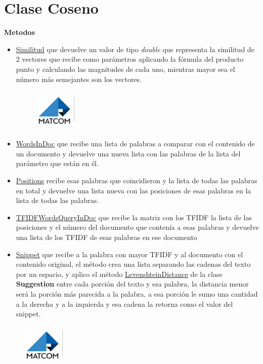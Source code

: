 \documentclass[a4paper,12pt]{article}
\begin{document}
\section{Clase Coseno}
\large\textbf{Metodos}
\begin{itemize}
    \item \underline{Similitud} que devuelve un valor de tipo \textit{double} que representa la similitud
    de 2 vectores que recibe como parámetros aplicando la fórmula del
    producto punto y calculando las magnitudes de cada uno, mientras
    mayor sea el número más semejantes son los vectores.
    \begin{figure}[t]
        \hspace{13cm}
    \includegraphics[width=2cm,height=2cm]{Logo de Matcom.png}
    \end{figure}
    \item \underline{WordsInDoc} que recibe una lista de palabras a comparar con el
    contenido de un documento y devuelve una nueva lista con las palabras
    de la lista del parámetro que están en él.
    \item \underline{Positions} recibe esas palabras que coincidieron y la lista de todas las
    palabras en total y devuelve una lista nueva con las posiciones de esas
    palabras en la lista de todas las palabras.
    \item \underline{TFIDFWordsQueryInDoc} que recibe la matriz con los TFIDF
    la lista
    de las posiciones y el número del documento que contenía a esas
    palabras y devuelve una lista de los TFIDF de esas palabras en ese
    documento
    \item \underline{Snippet} que recibe a la palabra con mayor TFIDF y al documento con
    el contenido original, el método crea una lista separando las cadenas
    del texto por un espacio, y aplico el método \underline{LevenshteinDistance} de la
    clase \textbf{Suggestion} entre cada porción del texto y esa palabra, la distancia
    menor será la porción más parecida a la palabra, a esa porción le sumo
    una cantidad a la derecha y a la izquierda y esa cadena la retorna como
    el valor del snippet.
\end{itemize}
\newpage
\begin{figure}[t]
    \hspace{13cm}
\includegraphics[width=2cm,height=2cm]{Logo de Matcom.png}
\end{figure}
\end{document}
